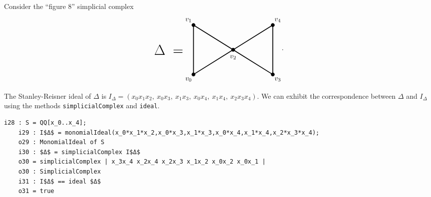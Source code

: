 \documentclass[12pt,leqno]{amsart}
\theoremstyle{definition}
\newenvironment{example}
{\pushQED{\qed}\renewcommand{\qedsymbol}{$\diamond$}\examplex}
{\popQED\endexamplex}
\begin{document}
%
\begin{example}\label{first example of the Stanley-Reisner correspondence}
  Consider the ``figure 8'' simplicial complex
  \begin{displaymath}
    \begin{tikzpicture}[scale = .5]
      \draw[-,very thick] (0,0) -- (0,5) -- (4,2.5) -- cycle;
      \draw[-,very thick] (8,0) -- (8,5) -- (4,2.5) -- cycle;
      \filldraw (0,0) circle (5pt);
      \filldraw (0,5) circle (5pt);
      \filldraw (4,2.5) circle (5pt);
      \filldraw (8,0) circle (5pt);
      \filldraw (8,5) circle (5pt);
      \node at (-.5,-.5) {$v_0$};
      \node at (-.5,5.5) {$v_1$};
      \node at (4,1.75) {$v_2$};
      \node at (8.5,-.5) {$v_3$};
      \node at (8.5,5.5) {$v_4$};
      \node at (-2.5,2.5) {\huge $\Delta \hspace{5pt} = $};
      \node at (9,2.5) {.};
    \end{tikzpicture}
  \end{displaymath}
  The Stanley-Reisner ideal of $\Delta$ is $I_\Delta = (x_0x_1x_2,\ x_0x_3,\ x_1x_3,\ x_0x_4,\ x_1x_4,\ x_2x_3x_4)$. We can exhibit the correspondence between $\Delta$ and $I_\Delta$ using the methods \texttt{simplicialComplex} and \texttt{ideal}.
  \begin{lstlisting}[basicstyle={\ttfamily \scriptsize}, xleftmargin=-23pt]
    i28 : S = QQ[x_0..x_4];
    i29 : I$Δ$ = monomialIdeal(x_0*x_1*x_2,x_0*x_3,x_1*x_3,x_0*x_4,x_1*x_4,x_2*x_3*x_4);
    o29 : MonomialIdeal of S
    i30 : $Δ$ = simplicialComplex I$Δ$
    o30 = simplicialComplex | x_3x_4 x_2x_4 x_2x_3 x_1x_2 x_0x_2 x_0x_1 |
    o30 : SimplicialComplex
    i31 : I$Δ$ == ideal $Δ$
    o31 = true
  \end{lstlisting}
\end{example}
\end{document}
